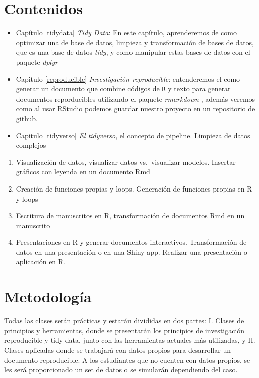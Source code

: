 \documentclass[]{book}
\begin{document}
\hypertarget{contenidos}{%
\section{Contenidos}\label{contenidos}}

\begin{itemize}
\item
  Capítulo \ref{tidydata} \emph{Tidy Data}: En este capítulo,
  aprenderemos de como optimizar una de base de datos, limpieza y
  transformación de bases de datos, que es una base de datos
  \emph{tidy}, y como manipular estas bases de datos con el paquete
  \emph{dplyr} \citep{R-dplyr}
\item
  Capitulo \ref{reproducible} \emph{Investigación reproducible}:
  entenderemos el como generar un documento que combine códigos de
  \texttt{R} y texto para generar documentos reporducibles utilizando el
  paquete \emph{rmarkdown} \citep{Allaire2018}, además veremos como al
  usar RStudio podemos guardar nuestro proyecto en un repositorio de
  github.
\item
  Capitulo \ref{tidyverso} \emph{El tidyverso}, el concepto de pipeline.
  Limpieza de datos complejos
\end{itemize}

\begin{enumerate}
\def\labelenumi{\arabic{enumi}.}
\setcounter{enumi}{4}
\item
  Visualización de datos, visualizar datos vs.~visualizar modelos.
  Insertar gráficos con leyenda en un documento Rmd
\item
  Creación de funciones propias y loops. Generación de funciones propias
  en R y loops
\item
  Escritura de manuscritos en R, transformación de documentos Rmd en un
  manuscrito
\item
  Presentaciones en R y generar documentos interactivos. Transformación
  de datos en una presentación o en una Shiny app. Realizar una
  presentación o aplicación en R.
\end{enumerate}

\hypertarget{metodologia}{%
\section{Metodología}\label{metodologia}}

Todas las clases serán prácticas y estarán divididas en dos partes: I.
Clases de principios y herramientas, donde se presentarán los principios
de investigación reproducible y tidy data, junto con las herramientas
actuales más utilizadas, y II. Clases aplicadas donde se trabajará con
datos propios para desarrollar un documento reproducible. A los
estudiantes que no cuenten con datos propios, se les será proporcionado
un set de datos o se simularán dependiendo del caso.
\end{document}
